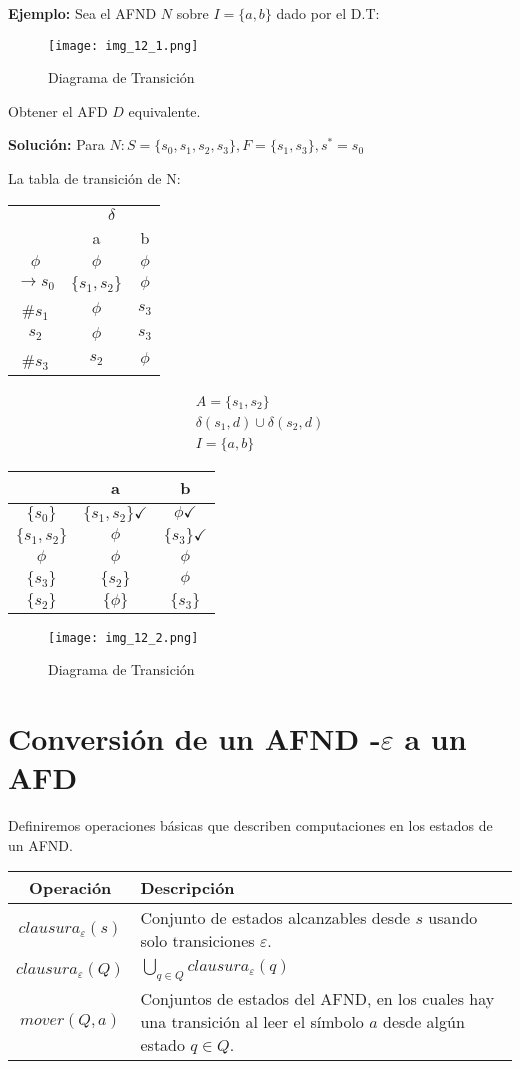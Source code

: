 \textbf{Ejemplo: }Sea el AFND $N$ sobre $I=\{a,b\}$ dado por el D.T:
\begin{figure}[h!]
\centering
\texttt{[image: img\_12\_1.png]}
\caption{Diagrama de Transición}\label{img_12_1}
\end{figure}
Obtener el AFD $D$ equivalente.

\textbf{Solución: }Para $N: S=\{s_0,s_1,s_2,s_3\}, F=\{s_1,s_3\}, s^*=s_0$

La tabla de transición de N:
\begin{center}
\begin{tabular}{c|cc}
	&\multicolumn{2}{c}{$\delta$}	\\
	&a	&b	\\ \hline
$\phi$	&$\phi$	&$\phi$	\\
$\rightarrow s_0$ &$\{s_1,s_2\}$	&$\phi$	\\
\#$s_1$	&$\phi$	&$s_3$	\\
$s_2$	&$\phi$	&$s_3$	\\
\#$s_3$	&$s_2$	&$\phi$
\end{tabular}
\end{center}
\begin{align*}
A=\{s_1,s_2\}	\\
\delta(s_1,d)\cup\delta(s_2,d)	\\
I=\{a,b\}
\end{align*}
\begin{center}
\begin{tabular}{c|cc}
	&a	&b	\\ \hline
$\{s_0\}$	&$\{s_1,s_2\}\checkmark$	&$\phi\checkmark$	\\
$\{s_1,s_2\}$	&$\phi$	&$\{s_3\}\checkmark$	\\
$\phi$	&$\phi$	&$\phi$	\\
$\{s_3\}$	&$\{s_2\}$	&$\phi$	\\
$\{s_2\}$	&$\{\phi\}$	&$\{s_3\}$
\end{tabular}
\end{center}
\begin{figure}[h!]
\centering
\texttt{[image: img\_12\_2.png]}
\caption{Diagrama de Transición}\label{img_12_2}
\end{figure}

\section{Conversión de un AFND -$\varepsilon$ a un AFD}
Definiremos operaciones básicas que describen computaciones en los estados de un AFND.
\begin{center}
\begin{tabular}{c|p{8cm}}
Operación	&Descripción	\\ \hline
$clausura_\varepsilon(s)$	&Conjunto de estados alcanzables desde $s$ usando solo transiciones $\varepsilon$.	\\
$clausura_\varepsilon(Q)$	&$\bigcup_{q\in Q}clausura_\varepsilon(q)$	\\
$mover(Q,a)$	&Conjuntos de estados del AFND, en los cuales hay una transición al leer el símbolo $a$ desde algún estado $q\in Q$.
\end{tabular}
\end{center}

